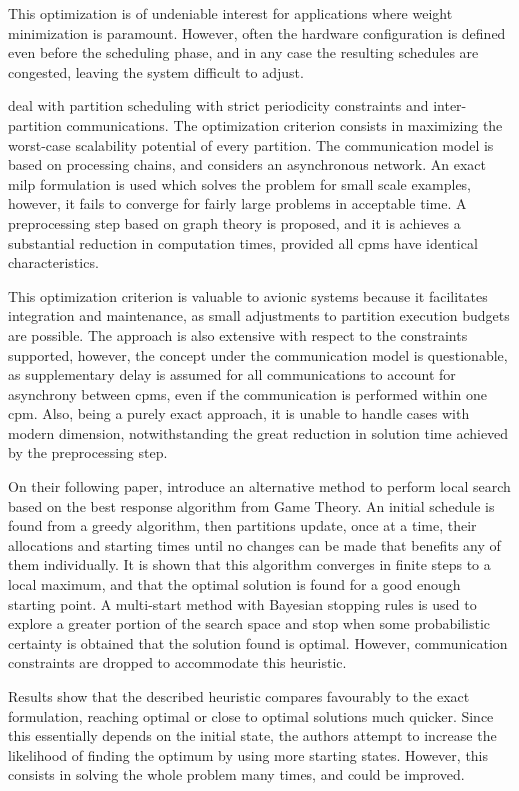 \documentclass[main.tex]{subfiles}
\begin{document}
This optimization is of undeniable interest for applications where weight minimization is paramount.
However, often the hardware configuration is defined even before the scheduling phase, and in any case the resulting schedules are congested, leaving the system difficult to adjust.

\Textcite{al2010partition} deal with partition scheduling with strict periodicity constraints and inter-partition communications.
The optimization criterion consists in maximizing the worst-case scalability potential of every partition.
The communication model is based on processing chains, and considers an asynchronous network.
An exact \gls{milp} formulation is used which solves the problem for small scale examples, however, it fails to converge for fairly large problems in acceptable time.
A preprocessing step based on graph theory is proposed, and it is achieves a substantial reduction in computation times, provided all \glspl{cpm} have identical characteristics.

This optimization criterion is valuable to avionic systems because it facilitates integration and maintenance, as small adjustments to partition execution budgets are possible.
The approach is also extensive with respect to the constraints supported, however, the concept under the communication model is questionable, as supplementary delay is assumed for all communications to account for asynchrony between \glspl{cpm}, even if the communication is performed within one \gls{cpm}.
Also, being a purely exact approach, it is unable to handle cases with modern dimension, notwithstanding the great reduction in solution time achieved by the preprocessing step.

On their following paper, \textcite{al2012strictly} introduce an alternative method to perform local search based on the best response algorithm from Game Theory.
An initial schedule is found from a greedy algorithm, then partitions update, once at a time, their allocations and starting times until no changes can be made that benefits any of them individually. 
It is shown that this algorithm converges in finite steps to a local maximum, and that the optimal solution is found for a good enough starting point.
A multi-start method with Bayesian stopping rules is used to explore a greater portion of the search space and stop when some probabilistic certainty is obtained that the solution found is optimal.
However, communication constraints are dropped to accommodate this heuristic.

Results show that the described heuristic compares favourably to the exact formulation, reaching optimal or close to optimal solutions much quicker.
Since this essentially depends on the initial state, the authors attempt to increase the likelihood of finding the optimum by using more starting states.
However, this consists in solving the whole problem many times, and could be improved.
\end{document}
